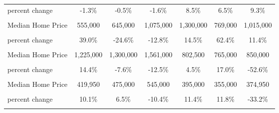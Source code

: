 \begin{table}
\begin{tabular}{lcccccc}
percent change & -1.3\% & -0.5\% & -1.6\% & 8.5\% & 6.5\% & 9.3\%\\
\textbf{\cellcolor{gray!10}{Santa Barbara County}} & \textbf{\cellcolor{gray!10}{}} & \textbf{\cellcolor{gray!10}{}} & \textbf{\cellcolor{gray!10}{}} & \textbf{\cellcolor{gray!10}{}} & \textbf{\cellcolor{gray!10}{}} & \textbf{\cellcolor{gray!10}{}}\\
Median Home Price & 555,000 & 645,000 & 1,075,000 & 1,300,000 & 769,000 & 1,015,000\\
\cellcolor{gray!10}{Median Home Price (\$2009)} & \cellcolor{gray!10}{705,726} & \cellcolor{gray!10}{532,138} & \cellcolor{gray!10}{463,941} & \cellcolor{gray!10}{530,982} & \cellcolor{gray!10}{862,288} & \cellcolor{gray!10}{960,941}\\
\addlinespace
percent change & 39.0\% & -24.6\% & -12.8\% & 14.5\% & 62.4\% & 11.4\%\\
\textbf{\cellcolor{gray!10}{South Coast}} & \textbf{\cellcolor{gray!10}{}} & \textbf{\cellcolor{gray!10}{}} & \textbf{\cellcolor{gray!10}{}} & \textbf{\cellcolor{gray!10}{}} & \textbf{\cellcolor{gray!10}{}} & \textbf{\cellcolor{gray!10}{}}\\
Median Home Price & 1,225,000 & 1,300,000 & 1,561,000 & 802,500 & 765,000 & 850,000\\
\cellcolor{gray!10}{Median Home Price (\$2009)} & \cellcolor{gray!10}{1,267,292} & \cellcolor{gray!10}{1,170,703} & \cellcolor{gray!10}{1,024,014} & \cellcolor{gray!10}{1,070,197} & \cellcolor{gray!10}{1,252,122} & \cellcolor{gray!10}{593,196}\\
percent change & 14.4\% & -7.6\% & -12.5\% & 4.5\% & 17.0\% & -52.6\%\\
\addlinespace
\textbf{\cellcolor{gray!10}{North Coast}} & \textbf{\cellcolor{gray!10}{}} & \textbf{\cellcolor{gray!10}{}} & \textbf{\cellcolor{gray!10}{}} & \textbf{\cellcolor{gray!10}{}} & \textbf{\cellcolor{gray!10}{}} & \textbf{\cellcolor{gray!10}{}}\\
Median Home Price & 419,950 & 475,000 & 545,000 & 395,000 & 355,000 & 374,950\\
\cellcolor{gray!10}{Median Home Price (\$2009)} & \cellcolor{gray!10}{368,110} & \cellcolor{gray!10}{391,900} & \cellcolor{gray!10}{351,049} & \cellcolor{gray!10}{391,033} & \cellcolor{gray!10}{437,160} & \cellcolor{gray!10}{291,978}\\
percent change & 10.1\% & 6.5\% & -10.4\% & 11.4\% & 11.8\% & -33.2\%\\
\textbf{\cellcolor{gray!10}{San Luis Obispo County}} & \textbf{\cellcolor{gray!10}{}} & \textbf{\cellcolor{gray!10}{}} & \textbf{\cellcolor{gray!10}{}} & \textbf{\cellcolor{gray!10}{}} & \textbf{\cellcolor{gray!10}{}} & \textbf{\cellcolor{gray!10}{}}\\

\end{tabular}
\end{table}
